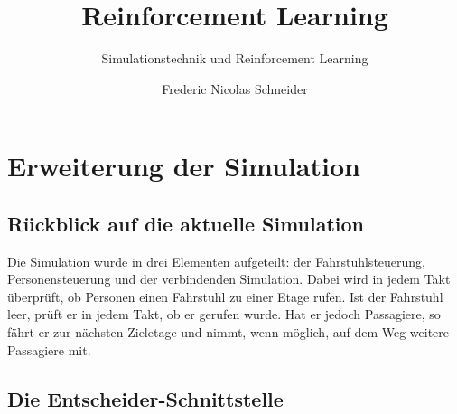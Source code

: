 \documentclass[envcountsame, envcountchap, deutsch]{i-studis}
\begin{document}
\title{Reinforcement Learning}
\subtitle{Simulationstechnik und Reinforcement Learning}

\author{Frederic Nicolas Schneider}


\address{Trier}


\mytitlepage

\frontmatter
\tableofcontents										%


\mainmatter
\newpage

\hypertarget{erweiterung-der-simulation}{%
\chapter{Erweiterung der Simulation}\label{erweiterung-der-simulation}}

\hypertarget{ruxfcckblick-auf-die-aktuelle-simulation}{%
\section{Rückblick auf die aktuelle
Simulation}\label{ruxfcckblick-auf-die-aktuelle-simulation}}

Die Simulation wurde in drei Elementen aufgeteilt: der
Fahrstuhlsteuerung, Personensteuerung und der verbindenden Simulation.
Dabei wird in jedem Takt überprüft, ob Personen einen Fahrstuhl zu einer
Etage rufen. Ist der Fahrstuhl leer, prüft er in jedem Takt, ob er
gerufen wurde. Hat er jedoch Passagiere, so fährt er zur nächsten
Zieletage und nimmt, wenn möglich, auf dem Weg weitere Passagiere mit.

\hypertarget{die-entscheider-schnittstelle}{%
\section{Die
Entscheider-Schnittstelle}\label{die-entscheider-schnittstelle}}
\end{document}
